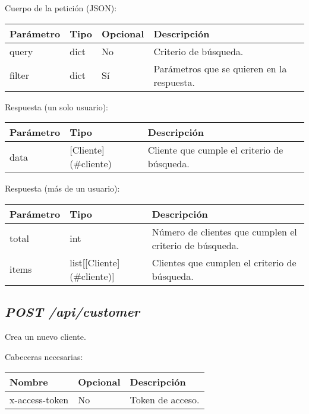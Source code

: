 Cuerpo de la petición (JSON):
\begin{table}[!h]
	\centering
	\begin{adjustbox}{max width=\textwidth}
	\begin{tabular}{|l|l|l|l|}
		\hline
		Parámetro & Tipo & Opcional & Descripción \\ \hline
		query & dict & No & Criterio de búsqueda. \\ \hline
		filter & dict & Sí & Parámetros que se quieren en la respuesta. \\ \hline
	\end{tabular}
\end{adjustbox}
\end{table}

Respuesta (un solo usuario):
\begin{table}[!h]
	\centering
	
	\begin{adjustbox}{max width=\textwidth}
	\begin{tabular}{|l|l|l|}
		\hline
		Parámetro & Tipo & Descripción \\ \hline
		data & [Cliente](\#cliente) & Cliente que cumple el criterio de búsqueda. \\ \hline
	\end{tabular}
\end{adjustbox}
\end{table}

Respuesta (más de un usuario):
\begin{table}[!h]
	\centering
	\begin{adjustbox}{max width=\textwidth}
	\begin{tabular}{|l|l|l|}
		\hline
		Parámetro & Tipo & Descripción \\ \hline
		total & int & Número de clientes que cumplen el criterio de búsqueda. \\ \hline
		items & list[[Cliente](\#cliente)] & Clientes que cumplen el criterio de búsqueda. \\ \hline
	\end{tabular}
\end{adjustbox}
\end{table}



\subsection{\textit{POST /api/customer}}
Crea un nuevo cliente.

Cabeceras necesarias:
\begin{table}[h!]
	\centering
	\begin{tabular}{|l|l|l|}
		\hline
		Nombre & Opcional & Descripción \\ \hline
		x-access-token & No & Token de acceso. \\ \hline
	\end{tabular}
\end{table}

